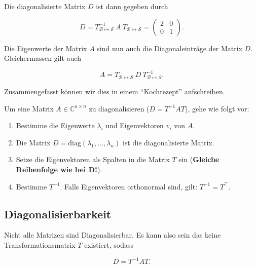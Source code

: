 Die diagonalisierte Matrix \( D \) ist dann gegeben durch

\begin{equation*}
    D = T_{\mathcal{B} \mapsto \mathcal{S} }^{-1} \ A \ T_{\mathcal{B} \mapsto \mathcal{S} } = \begin{pmatrix} 2 & 0 \\ 0 & 1 \end{pmatrix}.
\end{equation*}

Die Eigenwerte der Matrix \( A \) sind nun auch die Diagonaleinträge der Matrix \( D \). Gleichermassen gilt auch 

\begin{equation*}
    A = T_{\mathcal{B} \mapsto \mathcal{S} } \ D \ T_{\mathcal{B} \mapsto \mathcal{S} }^{-1}.
\end{equation*}

Zusammengefasst können wir dies in einem ``Kochrezept'' aufschreiben.

\begin{tcolorbox}[colback=gray!30, colframe=gray!80, title=Diagonalisieren]
    Um eine Matrix \( A \in \mathbb{C}^{n \times n} \) zu diagonalisieren (\( D = T^{-1}AT \)), gehe wie folgt vor:
    \begin{enumerate}
        \item Bestimme die Eigenwerte \( \lambda_i \) und Eigenvektoren \( v_i \) von \( A \).
        \item Die Matrix \( D = \text{diag}(\lambda_1, \dots , \lambda_n) \) ist die diagonalisierte Matrix.
        \item Setze die Eigenvektoren als Spalten in die Matrix \( T \) ein (\textbf{Gleiche Reihenfolge wie bei \( \mathbf{D} \)!}).
        \item Bestimme \( T^{-1} \). Falls Eigenvektoren orthonormal sind, gilt: \( T^{-1} = T^\top \).
    \end{enumerate}
\end{tcolorbox}

\subsection{Diagonalisierbarkeit}

Nicht alle Matrizen sind Diagonalisierbar. Es kann also sein das keine Transformationsmatrix \( T \) existiert, sodass

\begin{equation*}
    D = T^{-1} A T.
\end{equation*}

